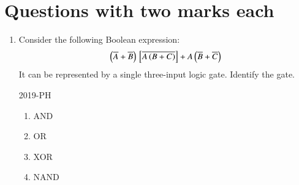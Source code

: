 \documentclass[journal,12pt,onecolumn]{IEEEtran}
\theoremstyle{remark}
\begin{document}
\section{Questions with two marks each}

\begin{enumerate}

\item Consider the following Boolean expression:
\begin{align*}
\left(\overline{A}+\overline{B}\right){}\left[\overline{A\left(B+C\right)}\right]+A\left(\overline{B}+\overline{C}\right)
\end{align*}
It can be represented by a single three-input logic gate. Identify the gate.

\hfill{2019-PH}


	\begin{multicols}{4}
	\begin{enumerate}
	\item AND
	\item OR
	\item XOR
	\item NAND
	\end{enumerate}
	\end{multicols}

\end{enumerate}
\end{document}
